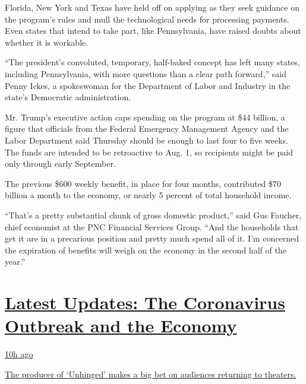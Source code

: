Florida, New York and Texas have held off on applying as they seek
guidance on the program's rules and mull the technological needs for
processing payments. Even states that intend to take part, like
Pennsylvania, have raised doubts about whether it is workable.

``The president's convoluted, temporary, half-baked concept has left
many states, including Pennsylvania, with more questions than a clear
path forward,'' said Penny Ickes, a spokeswoman for the Department of
Labor and Industry in the state's Democratic administration.

Mr. Trump's executive action caps spending on the program at \$44
billion, a figure that officials from the Federal Emergency Management
Agency and the Labor Department said Thursday should be enough to last
four to five weeks. The funds are intended to be retroactive to Aug. 1,
so recipients might be paid only through early September.

The previous \$600 weekly benefit, in place for four months, contributed
\$70 billion a month to the economy, or nearly 5 percent of total
household income.

``That's a pretty substantial chunk of gross domestic product,'' said
Gus Faucher, chief economist at the PNC Financial Services Group. ``And
the households that get it are in a precarious position and pretty much
spend all of it. I'm concerned the expiration of benefits will weigh on
the economy in the second half of the year.''

\hypertarget{latest-updates-the-coronavirus-outbreak-and-the-economy}{%
\section{\texorpdfstring{\href{https://www.nytimes3xbfgragh.onion/live/2020/08/20/business/stock-market-today-coronavirus?action=click\&pgtype=Article\&state=default\&region=MAIN_CONTENT_1\&context=storylines_live_updates}{Latest
Updates: The Coronavirus Outbreak and the
Economy}}{Latest Updates: The Coronavirus Outbreak and the Economy}}\label{latest-updates-the-coronavirus-outbreak-and-the-economy}}

\href{https://www.nytimes3xbfgragh.onion/live/2020/08/20/business/stock-market-today-coronavirus?action=click\&pgtype=Article\&state=default\&region=MAIN_CONTENT_1\&context=storylines_live_updates\#the-producer-of-unhinged-makes-a-big-bet-on-audiences-returning-to-theaters}{10h
ago}

\href{https://www.nytimes3xbfgragh.onion/live/2020/08/20/business/stock-market-today-coronavirus?action=click\&pgtype=Article\&state=default\&region=MAIN_CONTENT_1\&context=storylines_live_updates\#the-producer-of-unhinged-makes-a-big-bet-on-audiences-returning-to-theaters}{The
producer of `Unhinged' makes a big bet on audiences returning to
theaters.}


